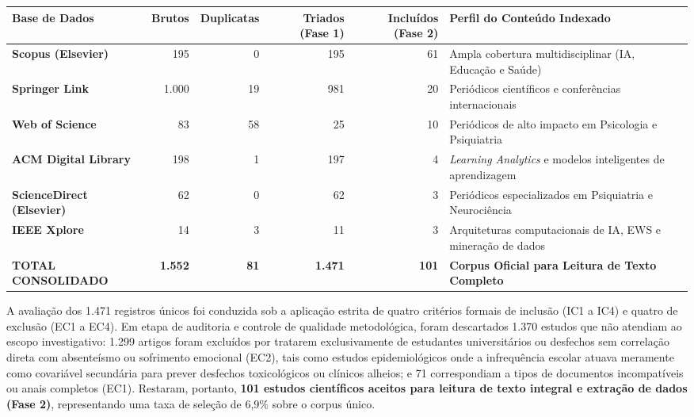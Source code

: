 \documentclass[10pt,a4paper]{article}
\begin{document}
\vspace{1pt}
\noindent
\begin{minipage}{\textwidth}
\centering
\footnotesize
{}
\label{tab:bases}
\begin{tabularx}{\textwidth}{lrrrrX}
\toprule
\textbf{Base de Dados} & \textbf{Brutos} & \textbf{Duplicatas} & \textbf{Triados (Fase 1)} & \textbf{Incluídos (Fase 2)} & \textbf{Perfil do Conteúdo Indexado} \\
\midrule
\textbf{Scopus (Elsevier)} & 195 & 0 & 195 & 61 & Ampla cobertura multidisciplinar (IA, Educação e Saúde) \\
\textbf{Springer Link} & 1.000 & 19 & 981 & 20 & Periódicos científicos e conferências internacionais \\
\textbf{Web of Science} & 83 & 58 & 25 & 10 & Periódicos de alto impacto em Psicologia e Psiquiatria \\
\textbf{ACM Digital Library} & 198 & 1 & 197 & 4 & \textit{Learning Analytics} e modelos inteligentes de aprendizagem \\
\textbf{ScienceDirect (Elsevier)} & 62 & 0 & 62 & 3 & Periódicos especializados em Psiquiatria e Neurociência \\
\textbf{IEEE Xplore} & 14 & 3 & 11 & 3 & Arquiteturas computacionais de IA, EWS e mineração de dados \\
\midrule
\textbf{TOTAL CONSOLIDADO} & \textbf{1.552} & \textbf{81} & \textbf{1.471} & \textbf{101} & \textbf{Corpus Oficial para Leitura de Texto Completo} \\
\bottomrule
\end{tabularx}
\end{minipage}
\vspace{1pt}

A avaliação dos 1.471 registros únicos foi conduzida sob a aplicação estrita de quatro critérios formais de inclusão (IC1 a IC4) e quatro de exclusão (EC1 a EC4). Em etapa de auditoria e controle de qualidade metodológica, foram descartados 1.370 estudos que não atendiam ao escopo investigativo: 1.299 artigos foram excluídos por tratarem exclusivamente de estudantes universitários ou desfechos sem correlação direta com absenteísmo ou sofrimento emocional (EC2), tais como estudos epidemiológicos onde a infrequência escolar atuava meramente como covariável secundária para prever desfechos toxicológicos ou clínicos alheios; e 71 correspondiam a tipos de documentos incompatíveis ou anais completos (EC1). Restaram, portanto, \textbf{101 estudos científicos aceitos para leitura de texto integral e extração de dados (Fase 2)}, representando uma taxa de seleção de 6,9\% sobre o corpus único.
\end{document}
